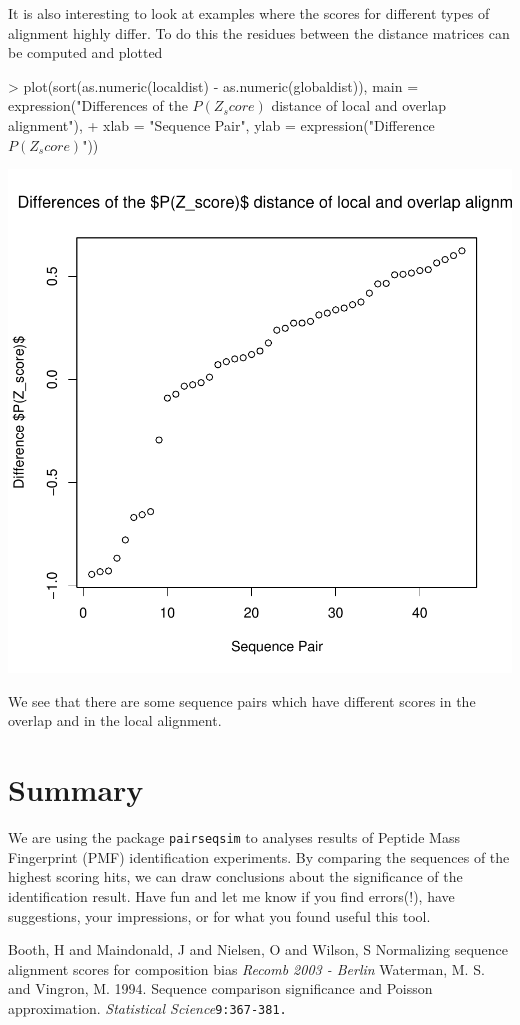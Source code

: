 \documentclass{article}
\begin{document}
It is also interesting to look at examples where the scores for different types of alignment highly differ. To do this the residues between the distance matrices can be computed and plotted
\begin{Schunk}
\begin{Sinput}
> plot(sort(as.numeric(localdist) - as.numeric(globaldist)), main = expression("Differences of the $P(Z_score)$ distance of local and overlap alignment"), 
+     xlab = "Sequence Pair", ylab = expression("Difference $P(Z_score)$"))
\end{Sinput}
\end{Schunk}
\includegraphics{SamplesSession-PlotResid}

We see that there are some sequence pairs which have different scores in the overlap and in the local alignment.

\section{Summary}

We are using the package \texttt{pairseqsim} to analyses results of Peptide Mass Fingerprint (PMF) identification experiments. By comparing the sequences of the highest scoring hits, we can draw conclusions about the significance of the identification result.
Have fun and let me know if you find errors(!), have suggestions, your impressions, or for what you found useful this tool.


\footnotesize
\begin{thebibliography}{99}
Booth, H and Maindonald, J and  Nielsen, O and Wilson, S
Normalizing sequence alignment scores for composition bias
{\em Recomb 2003 - Berlin}
Waterman, M. S. and Vingron, M. 1994. 
Sequence comparison significance and Poisson approximation. 
{\em Statistical Science}\texttt{9:367-381.}
\end{thebibliography}
\end{document}
